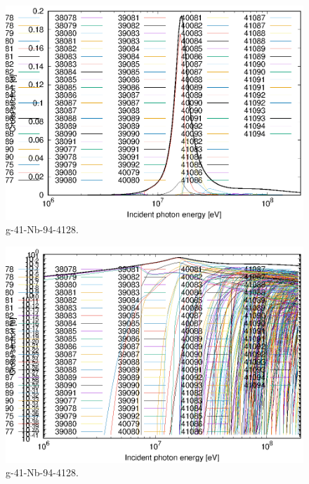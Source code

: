 \begin{figure}
 \includegraphics[width=\linewidth]{eps/g_41-Nb-94_4128.eps}
  \caption{g-41-Nb-94-4128.}
\end{figure}
\begin{figure}
 \includegraphics[width=\linewidth]{eps-log/g_41-Nb-94_4128.eps}
 \caption{g-41-Nb-94-4128.}
\end{figure}
\newpage \clearpage

